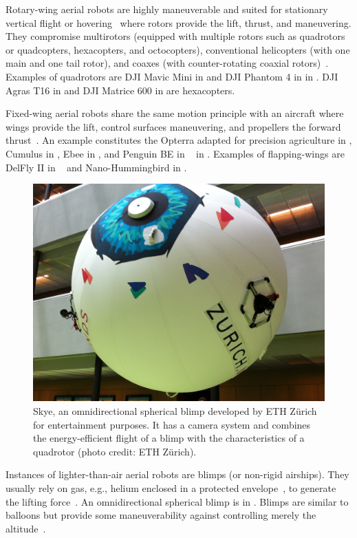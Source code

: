 Rotary-wing aerial robots are highly maneuverable and suited for stationary vertical flight or hovering~\citep{siciliano2016springer} where rotors provide the lift, thrust, and maneuvering. They compromise multirotors (equipped with multiple rotors such as quadrotors or quadcopters, hexacopters, and octocopters), conventional helicopters (with one main and one tail rotor), and coaxes (with counter-rotating coaxial rotors)~\citep{corke2017robotics}. Examples of quadrotors are DJI Mavic Mini in  and DJI Phantom 4 in  in . DJI Agras T16 in  and DJI Matrice 600 in  are hexacopters.

Fixed-wing aerial robots share the same motion principle with an aircraft where wings provide the lift, control surfaces maneuvering, and propellers the forward thrust~\citep{corke2017robotics}. An example constitutes the Opterra adapted for precision agriculture in , Cumulus in , Ebee in , and Penguin BE in ~\citep{haugen2016monitoring} in . Examples of flapping-wings are DelFly II in ~\citep{percin2012flow,groen2010improving,clercq2009aerodynamic} and Nano-Hummingbird in . 

\begin{figure}[t]
  \centering
  \includegraphics[width=.7\textwidth]{pictures/IMG_2612}
  \caption[Skye, an omnidirectional spherical blimp]{Skye, an omnidirectional spherical blimp developed by ETH Z\"urich for entertainment purposes. It has a camera system and combines the energy-efficient flight of a blimp with the characteristics of a quadrotor {\scriptsize(photo credit: ETH Z\"urich)}.}   
  \label{fig:skye-blimp}
\end{figure}
Instances of lighter-than-air aerial robots are blimps (or non-rigid airships). They usually rely on gas, e.g., helium enclosed in a protected envelope~\citep{burri2013design}, to generate the lifting force~\citep{fui2017recent}. An omnidirectional spherical blimp is in . Blimps are similar to balloons but provide some maneuverability against controlling merely the altitude~\citep{colombatti2011lighter}.

